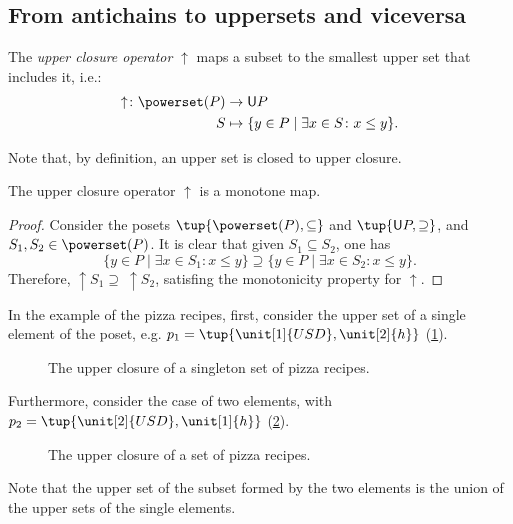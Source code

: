 \subsection{From antichains to uppersets and viceversa}
\begin{definition}
\label{def:upperclosure}
The \emph{upper closure operator} $\uparrow$ maps a subset to the smallest upper set that includes it, i.e.:
\begin{equation}
    \begin{aligned}
    \uparrow \colon \powerset(P)&\to \mathsf{U}P\\
    S&\mapsto \{y\in P \mid \exists x\in S \colon x\leq y\}.
    \end{aligned}
\end{equation}
\end{definition}
\begin{remark}
Note that, by definition, an upper set is closed to upper closure.
\end{remark}

\begin{lemma}
The upper closure operator $\uparrow$ is a monotone map.
\end{lemma}
\begin{proof}
Consider the posets $\tup{\powerset(P),\subseteq}$ and $\tup{\mathsf{U}P,\supseteq}$, and $S_1,S_2\in \powerset(P)$. It is clear that given $S_1\subseteq S_2$, one has
\begin{equation}
    \{y\in P\mid \exists x\in S_1\colon x\leq y\} \supseteq \{y\in P\mid \exists x\in S_2\colon x\leq y\}.
\end{equation}
Therefore, $\uparrow S_1\supseteq \ \uparrow S_2$, satisfing the monotonicity property for $\uparrow$.
\end{proof}

In the example of the pizza recipes, first, consider the upper set of a single element of the poset, e.g. $p_1=\tup{\unit[1]{USD},\unit[2]{h}}$  (\cref{fig:upperclosure_1}).
\begin{figure}[h!]
\begin{center}
\end{center}
\caption{The upper closure of a singleton set of pizza recipes. \label{fig:upperclosure_1}}
\end{figure}
Furthermore, consider the case of two elements, with $p_2=\tup{\unit[2]{USD},\unit[1]{h}}$ (\cref{fig:upperclosure_2}).

\begin{figure}[h!]
\begin{center}
\end{center}
\caption{The upper closure of a set of pizza recipes. \label{fig:upperclosure_2}}
\end{figure}
Note that the upper set of the subset formed by the two elements is the union of the upper sets of the single elements.


